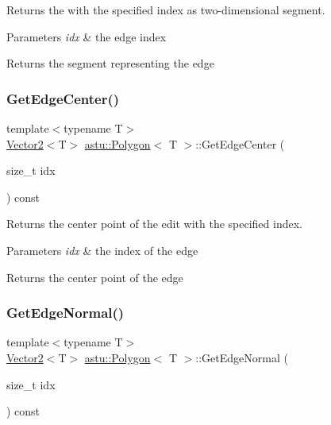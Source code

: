Returns the with the specified index as two-\/dimensional segment.


\begin{DoxyParams}{Parameters}
{\em idx} & the edge index \\
\hline
\end{DoxyParams}
\begin{DoxyReturn}{Returns}
the segment representing the edge 
\end{DoxyReturn}
\mbox{\label{classastu_1_1Polygon_a701964e09156820469360faa0eb70160}} 
\subsubsection{\texorpdfstring{Get\+Edge\+Center()}{GetEdgeCenter()}}
{\footnotesize\ttfamily template$<$typename T$>$ \\
\hyperlink{classastu_1_1Vector2}{Vector2}$<$T$>$ \hyperlink{classastu_1_1Polygon}{astu\+::\+Polygon}$<$ T $>$\+::Get\+Edge\+Center (\begin{DoxyParamCaption}\item[{size\+\_\+t}]{idx }\end{DoxyParamCaption}) const\hspace{0.3cm}{\ttfamily [inline]}}

Returns the center point of the edit with the specified index.


\begin{DoxyParams}{Parameters}
{\em idx} & the index of the edge \\
\hline
\end{DoxyParams}
\begin{DoxyReturn}{Returns}
the center point of the edge 
\end{DoxyReturn}
\mbox{\label{classastu_1_1Polygon_aeb8ca6b2c43a3b400e2cac7ec5d01770}} 
\subsubsection{\texorpdfstring{Get\+Edge\+Normal()}{GetEdgeNormal()}}
{\footnotesize\ttfamily template$<$typename T$>$ \\
\hyperlink{classastu_1_1Vector2}{Vector2}$<$T$>$ \hyperlink{classastu_1_1Polygon}{astu\+::\+Polygon}$<$ T $>$\+::Get\+Edge\+Normal (\begin{DoxyParamCaption}\item[{size\+\_\+t}]{idx }\end{DoxyParamCaption}) const\hspace{0.3cm}{\ttfamily [inline]}}

